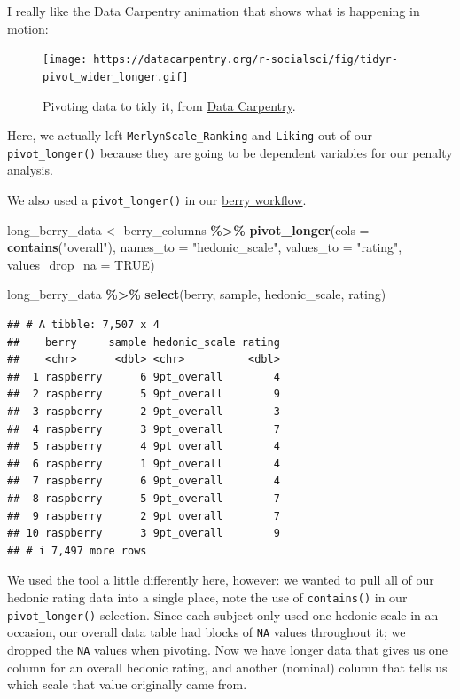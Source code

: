 \documentclass[
]{book}
\newenvironment{Shaded}{\begin{snugshade}}{\end{snugshade}}
\newcommand{\AttributeTok}[1]{\textcolor[rgb]{0.13,0.29,0.53}{#1}}
\newcommand{\ConstantTok}[1]{\textcolor[rgb]{0.56,0.35,0.01}{#1}}
\newcommand{\FunctionTok}[1]{\textcolor[rgb]{0.13,0.29,0.53}{\textbf{#1}}}
\newcommand{\NormalTok}[1]{#1}
\newcommand{\OtherTok}[1]{\textcolor[rgb]{0.56,0.35,0.01}{#1}}
\newcommand{\SpecialCharTok}[1]{\textcolor[rgb]{0.81,0.36,0.00}{\textbf{#1}}}
\newcommand{\StringTok}[1]{\textcolor[rgb]{0.31,0.60,0.02}{#1}}
\begin{document}
I really like the Data Carpentry animation that shows what is happening in motion:

\begin{figure}
\centering
\texttt{[image: https://datacarpentry.org/r-socialsci/fig/tidyr-pivot\_wider\_longer.gif]}
\caption{Pivoting data to tidy it, from \href{https://datacarpentry.org/r-socialsci/instructor/04-tidyr.html\#reshaping-with-pivot_wider-and-pivot_longer}{Data Carpentry}.}
\end{figure}

Here, we actually left \texttt{MerlynScale\_Ranking} and \texttt{Liking} out of our \texttt{pivot\_longer()} because they are going to be dependent variables for our penalty analysis.

We also used a \texttt{pivot\_longer()} in our \protect\hyperlink{berries}{berry workflow}.

\begin{Shaded}
\begin{Highlighting}[]
\NormalTok{long\_berry\_data }\OtherTok{\textless{}{-}} 
\NormalTok{  berry\_columns }\SpecialCharTok{\%\textgreater{}\%}
  \FunctionTok{pivot\_longer}\NormalTok{(}\AttributeTok{cols =} \FunctionTok{contains}\NormalTok{(}\StringTok{"overall"}\NormalTok{),}
               \AttributeTok{names\_to =} \StringTok{"hedonic\_scale"}\NormalTok{,}
               \AttributeTok{values\_to =} \StringTok{"rating"}\NormalTok{,}
               \AttributeTok{values\_drop\_na =} \ConstantTok{TRUE}\NormalTok{)}

\NormalTok{long\_berry\_data }\SpecialCharTok{\%\textgreater{}\%}
  \FunctionTok{select}\NormalTok{(berry, sample, hedonic\_scale, rating)}
\end{Highlighting}
\end{Shaded}

\begin{verbatim}
## # A tibble: 7,507 x 4
##    berry     sample hedonic_scale rating
##    <chr>      <dbl> <chr>          <dbl>
##  1 raspberry      6 9pt_overall        4
##  2 raspberry      5 9pt_overall        9
##  3 raspberry      2 9pt_overall        3
##  4 raspberry      3 9pt_overall        7
##  5 raspberry      4 9pt_overall        4
##  6 raspberry      1 9pt_overall        4
##  7 raspberry      6 9pt_overall        4
##  8 raspberry      5 9pt_overall        7
##  9 raspberry      2 9pt_overall        7
## 10 raspberry      3 9pt_overall        9
## # i 7,497 more rows
\end{verbatim}

We used the tool a little differently here, however: we wanted to pull all of our hedonic rating data into a single place, note the use of \texttt{contains()} in our \texttt{pivot\_longer()} selection. Since each subject only used one hedonic scale in an occasion, our overall data table had blocks of \texttt{NA} values throughout it; we dropped the \texttt{NA} values when pivoting. Now we have longer data that gives us one column for an overall hedonic rating, and another (nominal) column that tells us which scale that value originally came from.
\end{document}
